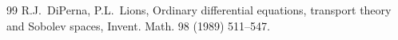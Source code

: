 \documentclass[10pt,a4paper]{amsart}
\numberwithin{equation}{section}
\begin{document}
\begin{thebibliography}{99}
 R.J.~DiPerna, P.L.~Lions, Ordinary differential equations, transport theory and Sobolev spaces, Invent. Math. 98 (1989) 511--547.
\end{thebibliography}
\end{document}
